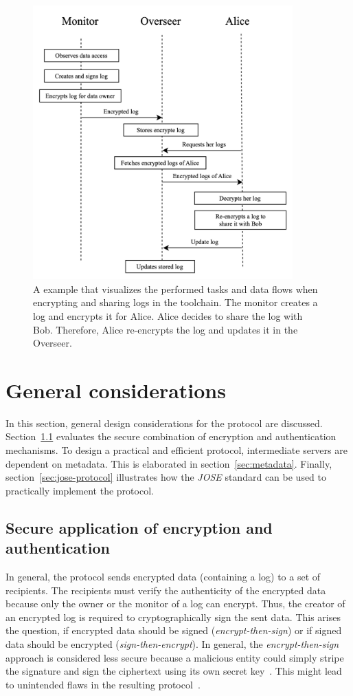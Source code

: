\documentclass[../main.tex]{subfiles}
\begin{document}
\begin{figure}[h!]
    \includegraphics[width=10cm]{../img/05/overview.jpg}
    \centering
    \caption{
        A example that visualizes the performed tasks and data flows when encrypting and sharing logs in the toolchain.
        The monitor creates a log and encrypts it for Alice.
        Alice decides to share the log with Bob.
        Therefore, Alice re-encrypts the log and updates it in the Overseer.
    }
    \label{fig:protocol-overview}
\end{figure}

\section{General considerations}
\label{sec:protocol-considerations}
In this section, general design considerations for the protocol are discussed.
Section~\ref{sec:sign-and-encrypt} evaluates the secure combination of encryption and authentication mechanisms.
To design a practical and efficient protocol, intermediate servers are dependent on metadata.
This is elaborated in section~\ref{sec:metadata}.
Finally, section~\ref{sec:jose-protocol} illustrates how the \textit{JOSE} standard can be used to practically implement the protocol.

\subsection{Secure application of encryption and authentication}
\label{sec:sign-and-encrypt}
In general, the protocol sends encrypted data (containing a log) to a set of recipients.
The recipients must verify the authenticity of the encrypted data because only the owner or the monitor of a log can encrypt.
Thus, the creator of an encrypted log is required to cryptographically sign the sent data.
This arises the question, if encrypted data should be signed (\textit{encrypt-then-sign}) or if signed data should be encrypted (\textit{sign-then-encrypt}).
In general, the \textit{encrypt-then-sign} approach is considered less secure because a malicious entity could simply stripe the signature and sign the ciphertext using its own secret key~\cite{Davis2001}.
This might lead to unintended flaws in the resulting protocol~\cite[section~11.2]{Jones2015a}.
\end{document}
